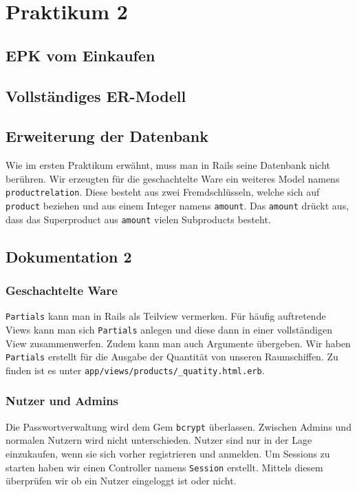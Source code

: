 \section{Praktikum 2}

\subsection{EPK vom Einkaufen}

\subsection{Vollst\"andiges ER-Modell}

\subsection{Erweiterung der Datenbank}
Wie im ersten Praktikum erw\"ahnt, muss man in Rails seine Datenbank nicht ber\"uhren. Wir erzeugten f\"ur die geschachtelte Ware ein weiteres Model namens \texttt{productrelation}. Diese besteht aus zwei Fremdschl\"usseln, welche sich auf \texttt{product} beziehen und aus einem Integer namens \texttt{amount}. Das \texttt{amount} dr\"uckt aus, dass das Superproduct aus \texttt{amount} vielen Subproducts besteht. 

\subsection{Dokumentation 2}

\subsubsection{Geschachtelte Ware}
\texttt{Partials} kann man in Rails als Teilview vermerken. F\"ur h\"aufig auftretende Views kann man sich \texttt{Partials} anlegen und diese dann in einer vollst\"andigen View zusammenwerfen. Zudem kann man auch Argumente \"ubergeben. Wir haben \texttt{Partials} erstellt f\"ur die Ausgabe der Quantit\"at von unseren Raumschiffen. Zu finden ist es unter \texttt{app/views/products/\_quatity.html.erb}. 

\subsubsection{Nutzer und Admins}
Die Passwortverwaltung wird dem Gem \texttt{bcrypt} \"uberlassen. Zwischen Admins und normalen Nutzern wird nicht unterschieden. Nutzer sind nur in der Lage einzukaufen, wenn sie sich vorher registrieren und anmelden. Um Sessions zu starten haben wir einen Controller namens \texttt{Session} erstellt. Mittels diesem \"uberpr\"ufen wir ob ein Nutzer eingeloggt ist oder nicht.

